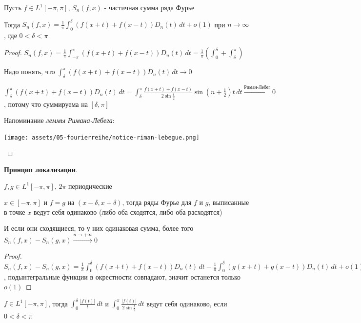 \begin{consequence}
    Пусть $f \in L^1 [-\pi, \pi]$, $S_n (f, x)$ - частичная сумма ряда Фурье

    Тогда $S_n (f, x) = \frac{1}{\pi} \int_0^\delta (f(x + t) + f(x - t)) D_n (t) \, dt + o(1)$ при $n \to \infty$, где $0 < \delta < \pi$
\end{consequence}

\begin{proof}
    $S_n (f, x) = \frac{1}{\pi} \int_{-\pi}^\pi (f(x + t) + f(x - t)) D_n (t) \,  dt = \frac{1}{\pi} \left( \int_{0}^\delta + \int_\delta^\pi \right)$

    Надо понять, что $\int_{\delta}^\pi (f(x + t) + f(x - t)) D_n (t) \,  dt \rightarrow 0$

    $\int_{\delta}^\pi (f(x + t) + f(x - t)) D_n (t) \,  dt = \int_\delta^\pi \frac{f(x + t) + f(x - t)}{2 \sin \frac{t}{2}} \sin (n + \frac{1}{2}) t \, dt \overset{\text{Риман-Лебег}}{\rightarrow} 0$, потому что суммируема на $[\delta, \pi]$

    Напоминание \textit{леммы Римана-Лебега}:

    \begin{center}
        \texttt{[image: assets/05-fourierreihe/notice-riman-lebegue.png]}
    \end{center}
\end{proof}

\begin{consequence}
    \textbf{Принцип локализации}.

    $f, g \in L^1 [-\pi, \pi]$, $2\pi$ периодические

    $x \in [-\pi, \pi]$ и $f = g$ на $(x - \delta, x + \delta)$, тогда ряды Фурье для $f$ и $g$, выписанные в точке $x$ ведут себя одинаково (либо оба сходятся, либо оба расходятся)

    И если они сходящиеся, то у них одинаковая сумма, более того $S_n (f, x) - S_n (g, x) \overset{n \to +\infty}{\rightarrow} 0$
\end{consequence}

\begin{proof}
    $S_n (f, x) - S_n (g, x) = \frac{1}{\pi} \int_0^\delta (f(x + t) + f(x - t)) D_n (t) \, dt - \frac{1}{\pi} \int_0^\delta (g(x + t) + g(x - t)) D_n (t) \, dt + o(1)$, подынтегральные функции в окрестности совпадают, значит останется только $o(1)$
\end{proof}


\begin{lemma}
    $f \in L^1 [-\pi, \pi]$, тогда $\int_0^\delta \frac{|f(t)|}{t} \, dt$ и $\int_0^\pi \frac{|f(t)|}{2\sin \frac{t}{2}} \, dt$ ведут себя одинаково,
    если $0 < \delta < \pi$
\end{lemma}

